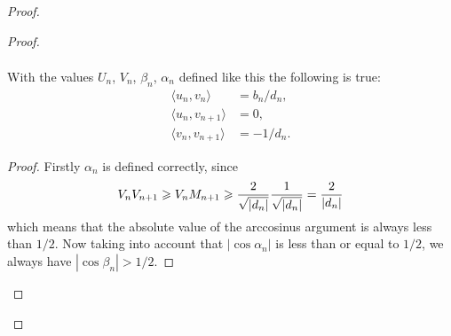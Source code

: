 \documentclass[12pt]{amsart}
\theoremstyle{case}
\begin{document}
\begin{proof}
\begin{proof}
\begin{prop}
\begin{align*}
                  \end{align*}
                  With the values $U_n$, $V_n$, $\beta_n$, $\alpha_n$ defined like this the following is true:
                  \begin{align*}
                      \langle u_n, v_n \rangle &= b_n/d_n,\\
                      \langle u_n, v_{n+1} \rangle &= 0,\\
                      \langle v_n, v_{n+1} \rangle &= -1/d_n.
                  \end{align*}
              \end{prop}
              \begin{proof}
                  Firstly $\alpha_n$ is defined correctly, since
                  $$
                  V_n V_{n+1} \geq V_n M_{n+1} \geq \frac{2}{\sqrt{\smash[b]{|d_n|}}} \frac{1}{\sqrt{\smash[b]{|d_n|}}}
                   = \frac{2}{|d_n|}
                  $$
                  which means that the absolute value of the arccosinus argument is always less than $1/2$. Now taking into
                  account that $|\cos{\alpha_n}|$ is less than or equal to $1/2$, we always have $|\cos{\beta_n}| > 1/2$.
                  

\end{proof}
\end{proof}
\end{proof}
\end{document}
